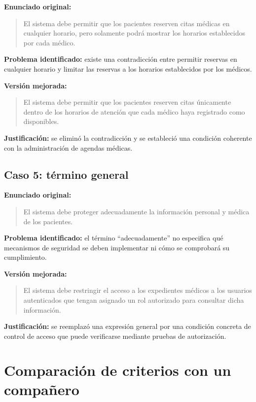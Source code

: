 \documentclass[12pt,a4paper]{article}
\begin{document}
\textbf{Enunciado original:}

\begin{quote}
El sistema debe permitir que los pacientes reserven citas médicas en cualquier horario, pero solamente podrá mostrar los horarios establecidos por cada médico.
\end{quote}

\textbf{Problema identificado:} existe una contradicción entre permitir reservas en cualquier horario y limitar las reservas a los horarios establecidos por los médicos.

\textbf{Versión mejorada:}

\begin{quote}
El sistema debe permitir que los pacientes reserven citas únicamente dentro de los horarios de atención que cada médico haya registrado como disponibles.
\end{quote}

\textbf{Justificación:} se eliminó la contradicción y se estableció una condición coherente con la administración de agendas médicas.

\subsection{Caso 5: término general}

\textbf{Enunciado original:}

\begin{quote}
El sistema debe proteger adecuadamente la información personal y médica de los pacientes.
\end{quote}

\textbf{Problema identificado:} el término ``adecuadamente'' no especifica qué mecanismos de seguridad se deben implementar ni cómo se comprobará su cumplimiento.

\textbf{Versión mejorada:}

\begin{quote}
El sistema debe restringir el acceso a los expedientes médicos a los usuarios autenticados que tengan asignado un rol autorizado para consultar dicha información.
\end{quote}

\textbf{Justificación:} se reemplazó una expresión general por una condición concreta de control de acceso que puede verificarse mediante pruebas de autorización.

\section{Comparación de criterios con un compañero}
\end{document}
